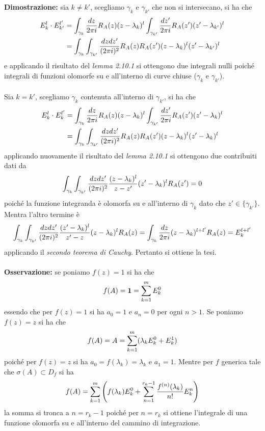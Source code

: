 \documentclass{article}
\begin{document}
\textbf{Dimostrazione:} sia $k \neq k'$, scegliamo $\gamma_k$ e $\gamma_{k'}$ che non si intersecano, si ha che
\begin{align}
    E_k^l \cdot E_{k'}^{l'} &= \int_{\gamma_k}\frac{dz}{2\pi i}R_A(z)(z - \lambda_k)^l\int_{\gamma_{k'}}\frac{dz'}{2\pi i}R_A(z')(z' - \lambda_{k'})^l \notag \\
    &= \int_{\gamma_k}\int_{\gamma_{k'}}\frac{dzdz'}{(2\pi i)^2}R_A(z)R_A(z')(z - \lambda_k)^l(z' - \lambda_{k'})^l \notag
\end{align}
e applicando il risultato del \textit{lemma 2.10.1} si ottengono due integrali nulli poiché integrali di funzioni olomorfe su e all'interno di curve chiuse ($\gamma_k$ e $\gamma_{k'}$). \\ \\
Sia $k = k'$, scegliamo $\gamma_k$ contenuta all'interno di $\gamma_{k'}$, si ha che
\begin{align}
     E_k^l \cdot E_{k}^{l'} &= \int_{\gamma_k}\frac{dz}{2\pi i}R_A(z)(z - \lambda_k)^l\int_{\gamma_{k'}}\frac{dz'}{2\pi i}R_A(z')(z' - \lambda_{k})^l \notag \\
    &= \int_{\gamma_k}\int_{\gamma_{k'}}\frac{dzdz'}{(2\pi i)^2}R_A(z)R_A(z')(z - \lambda_k)^l(z' - \lambda_{k})^l \notag
\end{align}
applicando nuovamente il risultato del \textit{lemma 2.10.1} si ottengono due contribuiti dati da
\begin{align}
    \int_{\gamma_k}\int_{\gamma_{k'}}\frac{dzdz'}{(2\pi i)^2}\frac{(z - \lambda_k)^l}{z - z'}(z' - \lambda_k)^lR_A(z') = 0 \notag
\end{align}
poiché la funzione integranda è olomorfa su e all'interno di $\gamma_k$ dato che $z' \in \{\gamma_{k'}\}$. Mentra l'altro termine è
\begin{align}
    \int_{\gamma_k}\int_{\gamma_{k'}}\frac{dzdz'}{(2\pi i)^2}\frac{(z' - \lambda_k)^l}{z' - z}(z - \lambda_k)^lR_A(z) \notag = \int_{\gamma_k}\frac{dz}{2\pi i}(z - \lambda_k)^{l + l'}R_A(z) = E_k^{l + l'} \notag
\end{align}
applicando il \textit{secondo teorema di Cauchy}. Pertanto si ottiene la tesi. \\ \\
\textbf{Osservazione:} se poniamo $f(z) = 1$ si ha che
\begin{align}
    f(A) = \mathbf{1} = \sum_{k = 1}^m E_k^0 \notag
\end{align}
essendo che per $f(z) = 1$ si ha $a_0 = 1$ e $a_n = 0$ per ogni $n > 1$. Se poniamo $f(z) = z$ si ha che
\begin{align}
    f(A) = A = \sum_{k = 1}^m(\lambda_kE_k^0 + E_k^1) \notag
\end{align}
poiché per $f(z) = z$ si ha $a_0 = f(\lambda_k) = \lambda_k$ e $a_1 = 1$. Mentre per $f$ generica tale che $\sigma(A) \subset D_f$ si ha
\begin{align}
    f(A) = \sum_{k = 1}^m\left(f(\lambda_k)E_k^0 + \sum_{n = 1}^{r_k - 1}\frac{f^{(n)}(\lambda_k)}{n!}E_k^n\right) \notag
\end{align}
la somma si tronca a $n = r_k - 1$ poiché per $n = r_k$ si ottiene l'integrale di una funzione olomorfa su e all'interno del cammino di integrazione.
\end{document}
